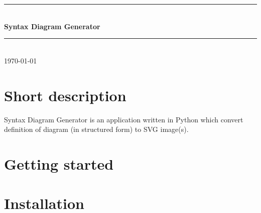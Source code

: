 \documentclass[12pt,a4paper]{article}
\newcommand{\HRule}{\rule{\linewidth}{0.5mm}}
\newcommand{\chapter}[1]{\section*{\Large#1}\setcounter{section}{0}}
\begin{document}

\begin{titlepage}
\vspace*{\fill}
\begin{center}



\HRule \\[0.4cm]
{ \huge \bfseries Syntax Diagram Generator}\\[0.4cm]

\HRule \\[1.5cm]



{\large \today}
\end{center}
\vspace*{\fill}

\end{titlepage}



\chapter{Short description}

Syntax Diagram Generator is an application written in Python which convert definition of diagram (in structured form) to SVG image(s). 

\chapter{Getting started}

\section{Installation}
\end{document}
